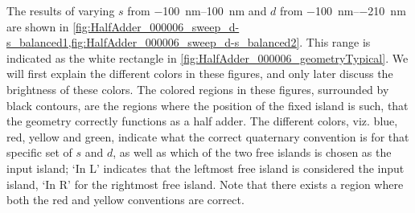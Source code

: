 \documentclass[11pt,a4paper,english,twoside]{article}
\begin{document}
The results of varying $s$ from \SIrange{-100}{100}{\nano\metre} and $d$ from \SIrange{-100}{-210}{\nano\metre} are shown in \cref{fig:HalfAdder_000006_sweep_d-s_balanced1,fig:HalfAdder_000006_sweep_d-s_balanced2}. This range is indicated as the white rectangle in \cref{fig:HalfAdder_000006_geometryTypical}. We will first explain the different colors in these figures, and only later discuss the brightness of these colors. The colored regions in these figures, surrounded by black contours, are the regions where the position of the fixed island is such, that the geometry correctly functions as a half adder. The different colors, viz. blue, red, yellow and green, indicate what the correct quaternary convention is for that specific set of $s$ and $d$, as well as which of the two free islands is chosen as the input island; `In L' indicates that the leftmost free island is considered the input island, `In R' for the rightmost free island. Note that there exists a region where both the red and yellow conventions are correct. \par
\end{document}
